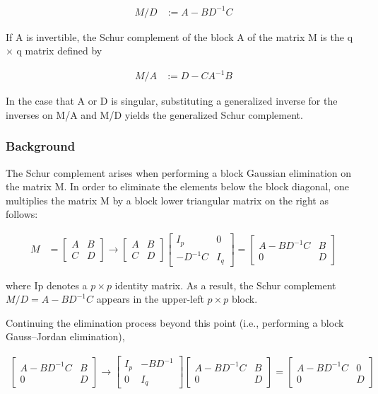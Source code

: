 \begin{align*}
	M/D &:= A - B D^{-1} C
\end{align*}

If A is invertible, the Schur complement of the block A of the matrix M is the q × q matrix defined by

\begin{align*}
	M/A &:= D - C A^{-1} B
\end{align*}

In the case that A or D is singular, substituting a generalized inverse for the inverses on M/A and M/D yields the generalized Schur complement.

\subsubsection{Background}

The Schur complement arises when performing a block Gaussian elimination on the matrix M. In order to eliminate the elements below the block diagonal, one multiplies the matrix M by a block lower triangular matrix on the right as follows:

\begin{align*}
	M &= \begin{bmatrix}
		A & B \\
		C & D
	\end{bmatrix} \rightarrow \begin{bmatrix}
	A & B \\
	C & D
\end{bmatrix} \begin{bmatrix}
I_{p} & 0 \\
-D^{-1}C & I_{q}
\end{bmatrix} = \begin{bmatrix}
A - BD^{-1}C & B \\
0 & D
\end{bmatrix}
\end{align*}

where Ip denotes a $p \times p$ identity matrix. As a result, the Schur complement $ M/D=A-BD^{-1}C$ appears in the upper-left $p \times p$ block.

Continuing the elimination process beyond this point (i.e., performing a block Gauss–Jordan elimination),

\begin{align*}
\begin{bmatrix}
		A - BD^{-1}C & B \\
		0 & D
	\end{bmatrix} \rightarrow \begin{bmatrix}
	I_{p} & -BD^{-1} \\
	0 & I_{q}
\end{bmatrix} \begin{bmatrix}
A - BD^{-1}C & B \\
0 & D
\end{bmatrix} = \begin{bmatrix}
A - BD^{-1}C & 0 \\
0 & D
\end{bmatrix} 
\end{align*}

